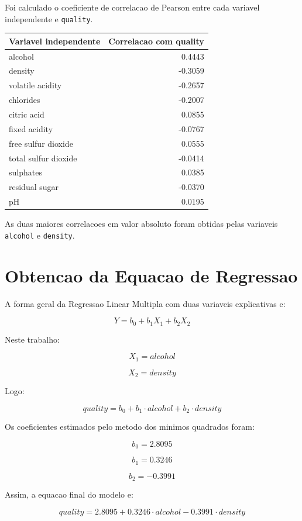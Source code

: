 \documentclass[12pt,a4paper]{article}
\begin{document}
Foi calculado o coeficiente de correlacao de Pearson entre cada variavel independente e \texttt{quality}.

\begin{table}[h]
\centering
\begin{tabular}{lr}
\toprule
\textbf{Variavel independente} & \textbf{Correlacao com quality} \\
\midrule
alcohol & 0.4443 \\
density & -0.3059 \\
volatile acidity & -0.2657 \\
chlorides & -0.2007 \\
citric acid & 0.0855 \\
fixed acidity & -0.0767 \\
free sulfur dioxide & 0.0555 \\
total sulfur dioxide & -0.0414 \\
sulphates & 0.0385 \\
residual sugar & -0.0370 \\
pH & 0.0195 \\
\bottomrule
\end{tabular}
\end{table}

As duas maiores correlacoes em valor absoluto foram obtidas pelas variaveis \texttt{alcohol} e \texttt{density}.

\section{Obtencao da Equacao de Regressao}

A forma geral da Regressao Linear Multipla com duas variaveis explicativas e:

\[
Y = b_0 + b_1X_1 + b_2X_2
\]

Neste trabalho:

\[
X_1 = alcohol
\]

\[
X_2 = density
\]

Logo:

\[
quality = b_0 + b_1 \cdot alcohol + b_2 \cdot density
\]

Os coeficientes estimados pelo metodo dos minimos quadrados foram:

\[
b_0 = 2.8095
\]

\[
b_1 = 0.3246
\]

\[
b_2 = -0.3991
\]

Assim, a equacao final do modelo e:

\[
quality = 2.8095 + 0.3246 \cdot alcohol -0.3991 \cdot density
\]
\end{document}
